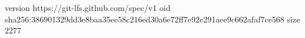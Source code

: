 version https://git-lfs.github.com/spec/v1
oid sha256:386901329dd3e8baa35ee58c216ed30a6e72ff7e92c291aee9c662afaf7ce568
size 2277
